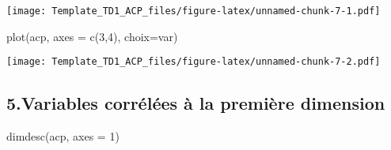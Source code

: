 \documentclass[
]{article}
\newenvironment{Shaded}{\begin{snugshade}}{\end{snugshade}}
\newcommand{\AttributeTok}[1]{\textcolor[rgb]{0.77,0.63,0.00}{#1}}
\newcommand{\DecValTok}[1]{\textcolor[rgb]{0.00,0.00,0.81}{#1}}
\newcommand{\FunctionTok}[1]{\textcolor[rgb]{0.00,0.00,0.00}{#1}}
\newcommand{\NormalTok}[1]{#1}
\newcommand{\StringTok}[1]{\textcolor[rgb]{0.31,0.60,0.02}{#1}}
\begin{document}
\texttt{[image: Template\_TD1\_ACP\_files/figure-latex/unnamed-chunk-7-1.pdf]}

\begin{Shaded}
\begin{Highlighting}[]
\FunctionTok{plot}\NormalTok{(acp, }\AttributeTok{axes =} \FunctionTok{c}\NormalTok{(}\DecValTok{3}\NormalTok{,}\DecValTok{4}\NormalTok{), }\AttributeTok{choix=}\StringTok{\textquotesingle{}var\textquotesingle{}}\NormalTok{)}
\end{Highlighting}
\end{Shaded}

\texttt{[image: Template\_TD1\_ACP\_files/figure-latex/unnamed-chunk-7-2.pdf]}

\hypertarget{variables-corruxe9luxe9es-uxe0-la-premiuxe8re-dimension}{%
\subsection{5.Variables corrélées à la première
dimension}\label{variables-corruxe9luxe9es-uxe0-la-premiuxe8re-dimension}}

\begin{Shaded}
\begin{Highlighting}[]
\FunctionTok{dimdesc}\NormalTok{(acp, }\AttributeTok{axes =} \DecValTok{1}\NormalTok{)}
\end{Highlighting}
\end{Shaded}
\end{document}
